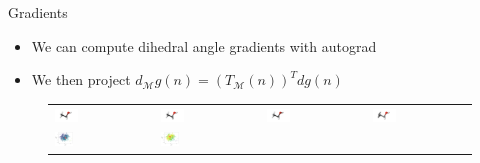 \begin{frame}{Gradients}
\begin{itemize}
    \item We can compute dihedral angle gradients with autograd
    \item We then project $d_{\mathcal M} g (n) = (T_{\mathcal M} (n))^T d g (n)$
\end{itemize}
\small
\begin{figure}[!htp]
    \centering
    \begin{tabular}{p{2.5cm}p{2.5cm}p{2.5cm}p{2.5cm}}
        \includegraphics[width=0.25\textwidth, trim={2cm 3cm 5cm 0cm}, clip]{img/ethanol_g0.png} &
        \includegraphics[width=0.25\textwidth, trim={2cm 3cm 5cm 0cm}, clip]{img/ethanol_g1.png} &
          \includegraphics[width=0.25\textwidth, trim={2cm 3cm 5cm 0cm}, clip]{img/ethanol_g2.png} &
          \includegraphics[width=0.25\textwidth, trim={2cm 3cm 5cm 0cm}, clip]{img/ethanol_g3.png}  \\
        \includegraphics[width=0.2\textwidth]{img/tangent_0.png} &
        \includegraphics[width=0.2\textwidth]{img/tangent_1.png} &

\end{tabular}
\end{figure}
\end{frame}

